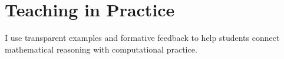 \documentclass[type=teaching]{careerdossier-statement}
\begin{document}
\MakeCDossierStatementHeader

\section*{Teaching in Practice}

I use transparent examples and formative feedback to help students connect
mathematical reasoning with computational practice.
\end{document}
